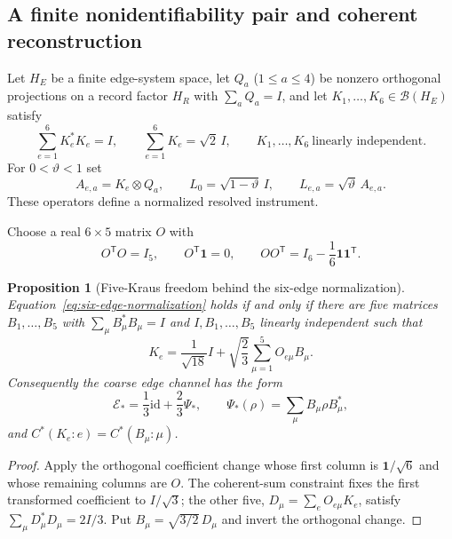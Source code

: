 \documentclass[11pt]{article}
\numberwithin{equation}{section}
\newtheorem{proposition}[theorem]{Proposition}
\theoremstyle{definition}
\theoremstyle{remark}
\newcommand{\id}{\mathrm{id}}
\begin{document}
\subsection{A finite nonidentifiability pair and coherent reconstruction}

Let $H_E$ be a finite edge-system space, let
$Q_a$ ($1\le a\le4$) be nonzero orthogonal projections on a record factor
$H_R$ with $\sum_aQ_a=I$, and let $K_1,\ldots,K_6\in\mathcal B(H_E)$ satisfy
\begin{equation}
 \sum_{e=1}^6K_e^*K_e=I,
 \qquad
 \sum_{e=1}^6K_e=\sqrt2\,I,
 \qquad
 K_1,\ldots,K_6\ \text{linearly independent}.
 \label{eq:six-edge-normalization}
\end{equation}
For $0<\vartheta<1$ set
\[
 A_{e,a}=K_e\otimes Q_a,
 \qquad L_0=\sqrt{1-\vartheta}\,I,
 \qquad L_{e,a}=\sqrt\vartheta\,A_{e,a}.
\]
These operators define a normalized resolved instrument.

Choose a real $6\times5$ matrix $O$ with
\begin{equation}
 O^{\mathsf T}O=I_5,
 \qquad O^{\mathsf T}\mathbf1=0,
 \qquad OO^{\mathsf T}=I_6-\frac16\mathbf1\mathbf1^{\mathsf T}.
 \label{eq:helmert-frame}
\end{equation}

\begin{proposition}[Five-Kraus freedom behind the six-edge normalization]
\label{prop:five-kraus-freedom}
Equation~\eqref{eq:six-edge-normalization} holds if and only if there are
five matrices $B_1,\ldots,B_5$ with
$\sum_\mu B_\mu^*B_\mu=I$ and
$I,B_1,\ldots,B_5$ linearly independent such that
\begin{equation}
 K_e=\frac1{\sqrt{18}}I
       +\sqrt{\frac23}\sum_{\mu=1}^5O_{e\mu}B_\mu.
 \label{eq:six-edge-normal-form}
\end{equation}
Consequently the coarse edge channel has the form
\[
 \mathcal E_* =\frac13\id+\frac23\Psi_*,
 \qquad \Psi_*(\rho)=\sum_\mu B_\mu\rho B_\mu^*,
\]
and $C^*(K_e:e)=C^*(B_\mu:\mu)$.
\end{proposition}

\begin{proof}
Apply the orthogonal coefficient change whose first column is
$\mathbf1/\sqrt6$ and whose remaining columns are $O$.  The coherent-sum
constraint fixes the first transformed coefficient to $I/\sqrt3$; the other
five, $D_\mu=\sum_eO_{e\mu}K_e$, satisfy
$\sum_\mu D_\mu^*D_\mu=2I/3$.  Put
$B_\mu=\sqrt{3/2}\,D_\mu$ and invert the orthogonal change.
\end{proof}
\end{document}

